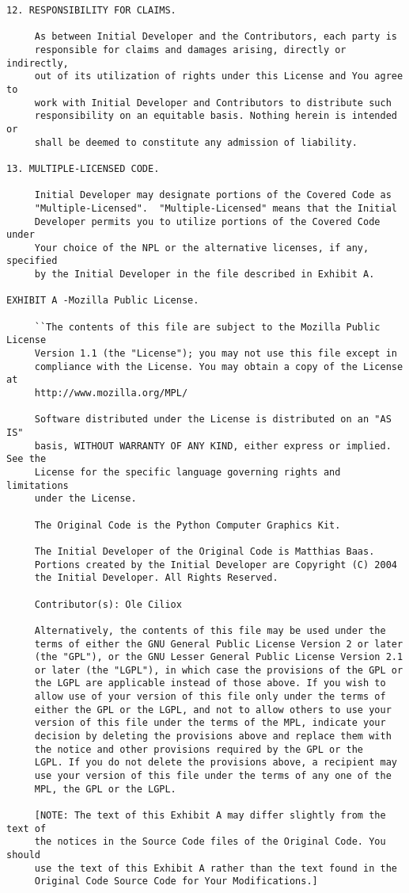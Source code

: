 \begin{verbatim}
12. RESPONSIBILITY FOR CLAIMS.

     As between Initial Developer and the Contributors, each party is
     responsible for claims and damages arising, directly or indirectly,
     out of its utilization of rights under this License and You agree to
     work with Initial Developer and Contributors to distribute such
     responsibility on an equitable basis. Nothing herein is intended or
     shall be deemed to constitute any admission of liability.

13. MULTIPLE-LICENSED CODE.

     Initial Developer may designate portions of the Covered Code as
     "Multiple-Licensed".  "Multiple-Licensed" means that the Initial
     Developer permits you to utilize portions of the Covered Code under
     Your choice of the NPL or the alternative licenses, if any, specified
     by the Initial Developer in the file described in Exhibit A.

EXHIBIT A -Mozilla Public License.

     ``The contents of this file are subject to the Mozilla Public License
     Version 1.1 (the "License"); you may not use this file except in
     compliance with the License. You may obtain a copy of the License at
     http://www.mozilla.org/MPL/

     Software distributed under the License is distributed on an "AS IS"
     basis, WITHOUT WARRANTY OF ANY KIND, either express or implied. See the
     License for the specific language governing rights and limitations
     under the License.

     The Original Code is the Python Computer Graphics Kit.

     The Initial Developer of the Original Code is Matthias Baas.
     Portions created by the Initial Developer are Copyright (C) 2004
     the Initial Developer. All Rights Reserved.

     Contributor(s): Ole Ciliox

     Alternatively, the contents of this file may be used under the
     terms of either the GNU General Public License Version 2 or later
     (the "GPL"), or the GNU Lesser General Public License Version 2.1
     or later (the "LGPL"), in which case the provisions of the GPL or
     the LGPL are applicable instead of those above. If you wish to
     allow use of your version of this file only under the terms of
     either the GPL or the LGPL, and not to allow others to use your
     version of this file under the terms of the MPL, indicate your
     decision by deleting the provisions above and replace them with
     the notice and other provisions required by the GPL or the
     LGPL. If you do not delete the provisions above, a recipient may
     use your version of this file under the terms of any one of the
     MPL, the GPL or the LGPL.

     [NOTE: The text of this Exhibit A may differ slightly from the text of
     the notices in the Source Code files of the Original Code. You should
     use the text of this Exhibit A rather than the text found in the
     Original Code Source Code for Your Modifications.]
\end{verbatim}
